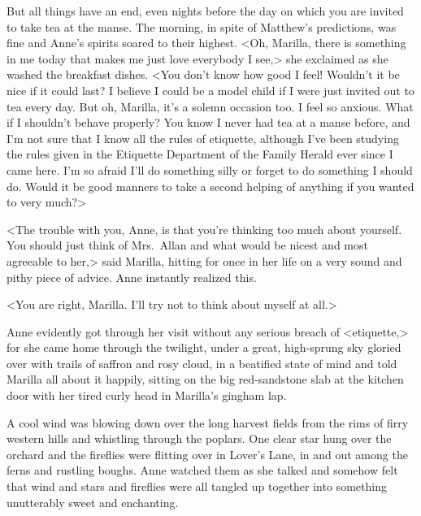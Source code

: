 But all things have an end, even nights before the day on which you are invited to take tea at the manse. The morning, in spite of Matthew's predictions, was fine and Anne's spirits soared to their highest. <Oh, Marilla, there is something in me today that makes me just love everybody I see,> she exclaimed as she washed the breakfast dishes. <You don't know how good I feel! Wouldn't it be nice if it could last? I believe I could be a model child if I were just invited out to tea every day. But oh, Marilla, it's a solemn occasion too. I feel so anxious. What if I shouldn't behave properly? You know I never had tea at a manse before, and I'm not sure that I know all the rules of etiquette, although I've been studying the rules given in the Etiquette Department of the Family Herald ever since I came here. I'm so afraid I'll do something silly or forget to do something I should do. Would it be good manners to take a second helping of anything if you wanted to very much?>

<The trouble with you, Anne, is that you're thinking too much about yourself. You should just think of Mrs.~Allan and what would be nicest and most agreeable to her,> said Marilla, hitting for once in her life on a very sound and pithy piece of advice. Anne instantly realized this.

<You are right, Marilla. I'll try not to think about myself at all.>

Anne evidently got through her visit without any serious breach of <etiquette,> for she came home through the twilight, under a great, high-sprung sky gloried over with trails of saffron and rosy cloud, in a beatified state of mind and told Marilla all about it happily, sitting on the big red-sandstone slab at the kitchen door with her tired curly head in Marilla's gingham lap.

A cool wind was blowing down over the long harvest fields from the rims of firry western hills and whistling through the poplars. One clear star hung over the orchard and the fireflies were flitting over in Lover's Lane, in and out among the ferns and rustling boughs. Anne watched them as she talked and somehow felt that wind and stars and fireflies were all tangled up together into something unutterably sweet and enchanting.

